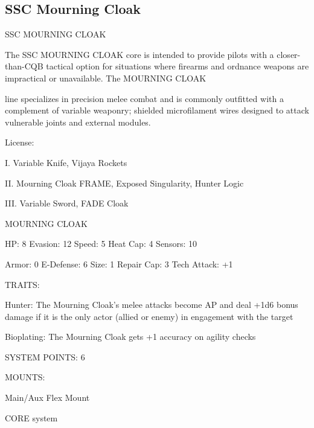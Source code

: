 \subsection{SSC Mourning Cloak}

                                    SSC MOURNING CLOAK  

The SSC MOURNING CLOAK core is intended to provide pilots with a closer-than-CQB tactical option for  
situations where firearms and ordnance weapons are impractical or unavailable. The MOURNING CLOAK  

line specializes in precision melee combat and is commonly outfitted with a complement of variable  
weaponry; shielded microfilament wires designed to attack vulnerable joints and external modules. 
 

                                                  License:
 
I. Variable Knife, Vijaya Rockets
 
II. Mourning Cloak FRAME, Exposed Singularity, Hunter Logic
 
III. Variable Sword, FADE Cloak
 

                                           MOURNING CLOAK 

  HP: 8          Evasion: 12                          Speed: 5           Heat Cap: 4        Sensors: 10 

  Armor: 0       E-Defense: 6                         Size: 1            Repair Cap: 3      Tech Attack:  
                                                                                            +1 

                                                   TRAITS: 

  Hunter: The Mourning Cloak’s melee attacks become AP and deal +1d6 bonus damage if it is the only  
  actor (allied or enemy) in engagement with the target
 
  Bioplating: The Mourning Cloak gets +1 accuracy on agility checks 

                                             SYSTEM POINTS: 6 

                                                  MOUNTS: 

  Main/Aux                                             Flex Mount 

                                                CORE system 

                                                                                                           


